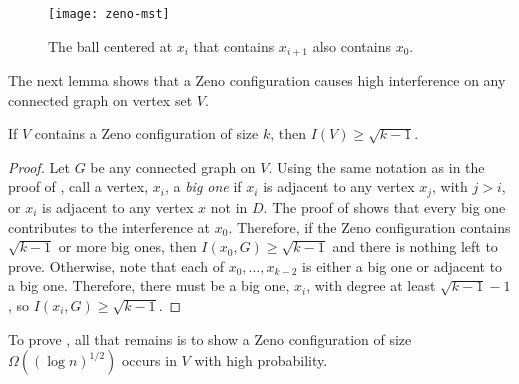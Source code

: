\documentclass{patmorin}
\begin{document}
\begin{figure}
  \begin{center}
    \texttt{[image: zeno-mst]}
  \end{center}
  \caption{The ball centered at $x_i$ that contains $x_{i+1}$ also contains $x_0$.}
\end{figure}

The next lemma shows that a Zeno configuration causes high interference on
any connected graph on vertex set $V$.

\begin{lem}
If $V$ contains a Zeno configuration of size $k$, then $I(V)\ge\sqrt{k-1}$.
\end{lem}

\begin{proof}
Let $G$ be any connected graph on $V$.  Using the same notation as
in the proof of , call a vertex, $x_i$, a \emph{big
one} if $x_i$ is adjacent to any vertex $x_j$, with $j>i$, or $x_i$ is
adjacent to any vertex $x$ not in $D$.  The proof of 
shows that every big one contributes to the interference at $x_0$.
Therefore, if the Zeno configuration contains $\sqrt{k-1}$ or more big
ones, then $I(x_0,G)\ge\sqrt{k-1}$ and there is nothing left to prove.
Otherwise, note that each of $x_0,\ldots,x_{k-2}$ is either a big one
or adjacent to a big one. Therefore, there must be a big one, $x_i$,
with degree at least $\sqrt{k-1}-1$, so $I(x_i,G)\ge\sqrt{k-1}$.
\end{proof}

To prove , all that remains is to show a Zeno
configuration of size $\Omega((\log n)^{1/2})$ occurs in $V$ with high
probability.
\end{document}
